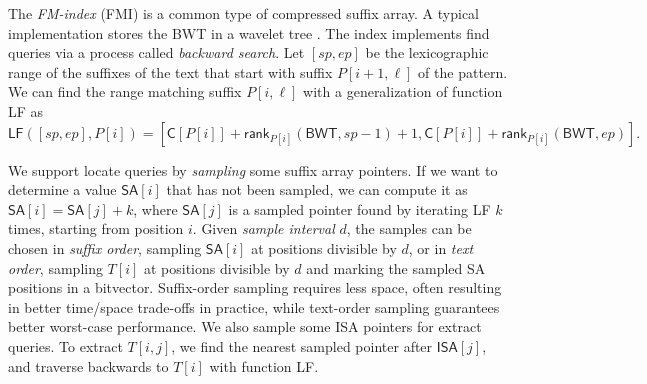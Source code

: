 \documentclass[a4paper,11pt]{llncs}
\newcommand{\SA}{\textsf{SA}}
\newcommand{\ISA}{\textsf{ISA}}
\newcommand{\BWT}{\textsf{BWT}}
\newcommand{\FMI}{\textsf{FMI}}
\newcommand{\mSA}{\ensuremath{\mathsf{SA}}}
\newcommand{\mISA}{\ensuremath{\mathsf{ISA}}}
\newcommand{\mBWT}{\ensuremath{\mathsf{BWT}}}
\newcommand{\mC}{\ensuremath{\mathsf{C}}}
\newcommand{\LF}{\textsf{LF}}
\newcommand{\find}{\textsf{find}}
\newcommand{\locate}{\textsf{locate}}
\newcommand{\extract}{\textsf{extract}}
\newcommand{\mLF}{\ensuremath{\mathsf{LF}}}
\newcommand{\mrank}{\ensuremath{\mathsf{rank}}}
\begin{document}
The \emph{FM-index} (\FMI) \cite{Ferragina2005a} is a common type of
compressed suffix array. A typical implementation stores the \BWT{} in a
wavelet tree \cite{Grossi2003}. The index implements \find{} queries via a
process called \emph{backward search}. Let $[sp,ep]$ be the lexicographic
range of the suffixes of the text that start with suffix $P[i+1,\ell]$ of the
pattern. We can find the range matching suffix $P[i,\ell]$ with a
generalization of function \LF{} as
$$
\mLF([sp,ep],P[i]) =
[\mC[P[i]] + \mrank_{P[i]}(\mBWT, sp-1) + 1,
\mC[P[i]] + \mrank_{P[i]}(\mBWT, ep)].
$$

We support \locate{} queries by \emph{sampling} some suffix array pointers. If
we want to determine a value $\mSA[i]$ that has not been sampled, we can
compute it as $\mSA[i] = \mSA[j]+k$, where $\mSA[j]$ is a sampled pointer
found by iterating \LF{} $k$ times, starting from position $i$. Given
\emph{sample interval} $d$, the samples can be chosen in \emph{suffix order},
sampling $\mSA[i]$ at positions divisible by $d$, or in \emph{text order},
sampling $T[i]$ at positions divisible by $d$ and marking the sampled \SA{}
positions in a bitvector. Suffix-order sampling requires less space, often
resulting in better time/space trade-offs in practice, while text-order
sampling guarantees better worst-case performance. We also sample some \ISA{}
pointers for \extract{} queries. To extract $T[i,j]$, we find the nearest
sampled pointer after $\mISA[j]$, and traverse backwards to $T[i]$ with
function \LF.
\end{document}
